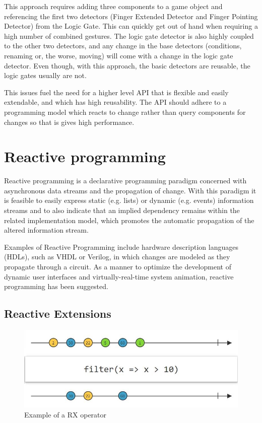 \documentclass[12pt,a4paper,twoside]{report}
\begin{document}
This approach requires adding three components to a game object and referencing the first two detectors (Finger Extended Detector and Finger Pointing Detector) from the Logic Gate. This can quickly get out of hand when requiring a high number of combined gestures. The logic gate detector is also highly coupled to the other two detectors, and any change in the base detectors (conditions, renaming or, the worse, moving) will come with a change in the logic gate detector. Even though, with this approach, the basic detectors are reusable, the logic gates usually are not.

This issues fuel the need for a higher level API that is flexible and easily extendable, and which has high reusability. The API should adhere to a programming model which reacts to change rather than query components for changes so that is gives high performance.

\section{Reactive programming}
Reactive programming is a declarative programming paradigm concerned with asynchronous data streams and the propagation of change. With this paradigm it is feasible to easily express static (e.g. lists) or dynamic (e.g. events) information streams and to also indicate that an implied dependency remains within the related implementation model, which promotes the automatic propagation of the altered information stream.

Examples of Reactive Programming include hardware description languages (HDLs), such as VHDL or Verilog, in which changes are modeled as they propagate through a circuit. As a manner to optimize the development of dynamic user interfaces and virtually-real-time system animation, reactive programming has been suggested.

\subsection{Reactive Extensions}

\begin{figure}[h]
  \centering
  \includegraphics[width=0.9\linewidth]{img/RX_filter.JPG}
  \caption{Example of a RX operator}
  \label{fig:rx_filter}
\end{figure}
  
\end{document}
